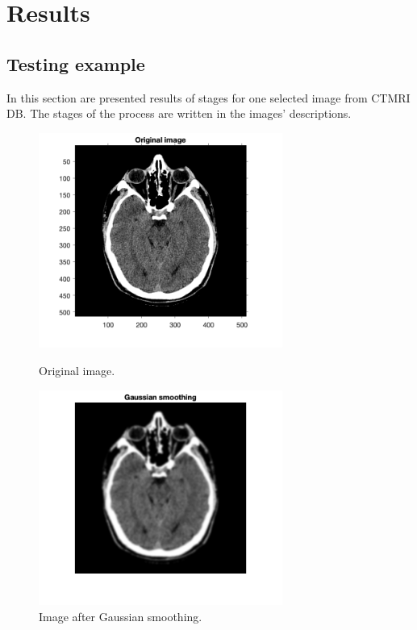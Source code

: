 \documentclass[a4paper,11pt]{article}
\begin{document}
\section{Results}

\subsection{Testing example}
In this section are presented results of stages for one selected image from CTMRI DB. The stages of the process are written in the images' descriptions.

\begin{figure}[ht!]
    \begin{minipage}{0.5\textwidth}
        \centering
        \includegraphics[width=80mm]{original.png}
        \caption{Original image.}
    \end{minipage}\hfill
    \begin{minipage}{0.5\textwidth}
        \centering
        \includegraphics[width=80mm]{gauss.png}
        \caption{Image after Gaussian smoothing.}
    \end{minipage}\hfill
\end{figure}
\noindent
\end{document}
